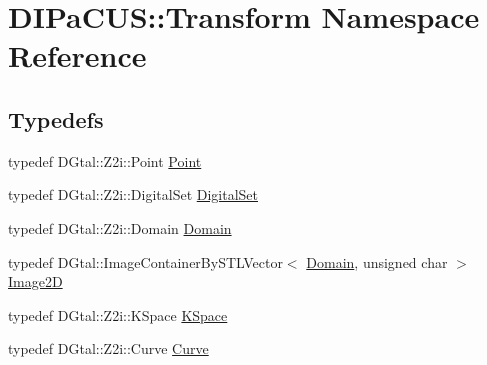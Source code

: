 \hypertarget{namespaceDIPaCUS_1_1Transform}{}\section{D\+I\+Pa\+C\+US\+:\+:Transform Namespace Reference}
\label{namespaceDIPaCUS_1_1Transform}
\subsection*{Typedefs}
\begin{DoxyCompactItemize}
\item 
typedef D\+Gtal\+::\+Z2i\+::\+Point \hyperlink{namespaceDIPaCUS_1_1Transform_a3d5053cb006656a776156934f3c365ec}{Point}
\item 
typedef D\+Gtal\+::\+Z2i\+::\+Digital\+Set \hyperlink{namespaceDIPaCUS_1_1Transform_aa5173fa40d34010f28dfcd617f2fd49b}{Digital\+Set}
\item 
typedef D\+Gtal\+::\+Z2i\+::\+Domain \hyperlink{namespaceDIPaCUS_1_1Transform_a6da009851d50adae6e3e93ce4550cbda}{Domain}
\item 
typedef D\+Gtal\+::\+Image\+Container\+By\+S\+T\+L\+Vector$<$ \hyperlink{namespaceDIPaCUS_1_1Transform_a6da009851d50adae6e3e93ce4550cbda}{Domain}, unsigned char $>$ \hyperlink{namespaceDIPaCUS_1_1Transform_a73f8942865bc5b3a01401bf07efd3734}{Image2D}
\item 
typedef D\+Gtal\+::\+Z2i\+::\+K\+Space \hyperlink{namespaceDIPaCUS_1_1Transform_a29a1b6c9e9e766045633377156b5a81c}{K\+Space}
\item 
typedef D\+Gtal\+::\+Z2i\+::\+Curve \hyperlink{namespaceDIPaCUS_1_1Transform_ae8200b02a170f9d9f68b8d345924b2c3}{Curve}
\end{DoxyCompactItemize}

